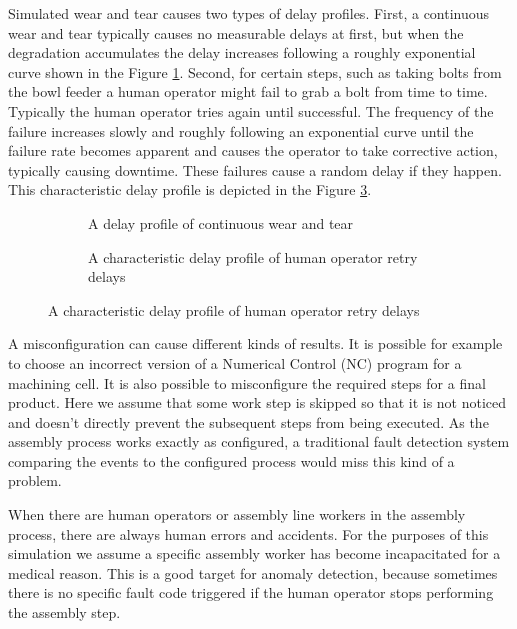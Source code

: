 \documentclass[procedia]{easychair}
\begin{document}
Simulated wear and tear causes two types of delay profiles. First,
a continuous wear and tear typically causes no measurable delays at first, but when the degradation accumulates the delay increases following
a roughly exponential curve shown in the Figure \ref{figure:continuouswearandtear}. Second, for certain steps, such as taking bolts from the bowl feeder a human operator
might fail to grab a bolt from time to time. Typically the human operator tries again until successful. The frequency of the failure increases
slowly and roughly following an exponential curve until the failure rate becomes apparent and causes the operator to take corrective action,
typically causing downtime. These failures cause a random delay if they happen. This characteristic delay profile is depicted in the Figure \ref{figure:retrydelays}.

\begin{figure}[tb]
\begin{subfigure}[h]{0.5\linewidth}
 \resizebox{0.95\linewidth}{!}{}
 \caption{A delay profile of continuous wear and tear}
 \label{figure:continuouswearandtear}
\end{subfigure}
\begin{subfigure}[h]{0.5\linewidth}
 \resizebox{0.95\linewidth}{!}{}
 \caption{A characteristic delay profile of human operator retry delays}
 \label{figure:retrydelays}
\end{subfigure}
\end{figure}

A misconfiguration can cause different kinds of results. It is possible for example to choose an incorrect version of a Numerical Control (NC) program for a machining cell. It is also possible to
misconfigure the required steps for a final product. Here we assume that some work step is skipped
so that it is not noticed and doesn't directly prevent the subsequent steps from being executed. As the assembly process works exactly as configured, a traditional fault detection system comparing
the events to the configured process would miss this kind of a problem.

When there are human operators or assembly line workers in the assembly process, there are always human errors and accidents. For the purposes of this simulation we
assume a specific assembly worker has become incapacitated for a medical reason. This is a good target for anomaly detection, because sometimes there is no specific fault code
triggered if the human operator stops performing the assembly step.
\end{document}
